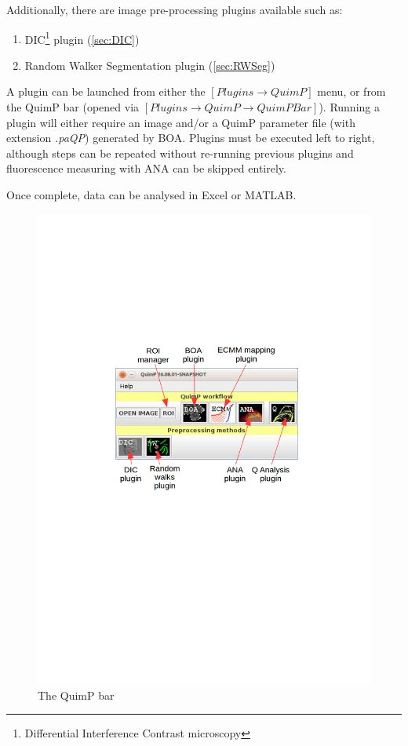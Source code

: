 \documentclass[a4paper,12pt]{article}
\begin{document}
Additionally, there are image pre-processing plugins available such as:

\begin{enumerate}
	\item DIC\footnote{Differential Interference Contrast microscopy} plugin (\autoref{sec:DIC})
	\item Random Walker Segmentation plugin (\autoref{sec:RWSeg})
\end{enumerate}

A plugin can be launched from either the $[Plugins\rightarrow QuimP]$ menu, or from the QuimP bar
(opened via $[Plugins\rightarrow QuimP\rightarrow QuimP Bar]$).
Running a plugin will either require an image and/or a QuimP parameter file (with extension \textit{.paQP}) generated by BOA.
Plugins must be executed left to right, although steps can be repeated without re-running previous plugins and fluorescence measuring with ANA can be skipped entirely.

Once complete, data can be analysed in Excel or MATLAB.

\begin{figure}[ht]
   \centering
   \includegraphics[width=15cm]{quimpBar.png} %
   \caption{The QuimP bar}
   \label{fig:quimpBar}
\end{figure}
\end{document}
